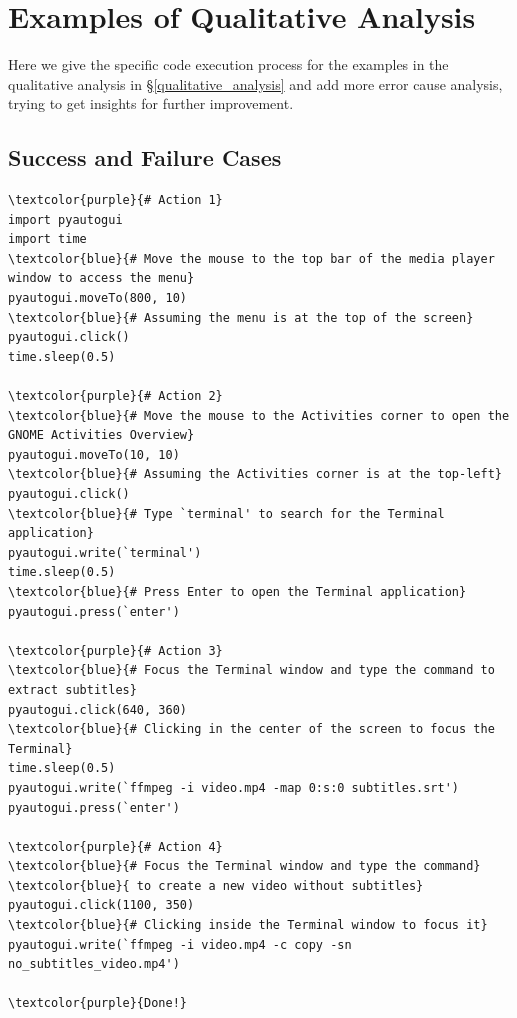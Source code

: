 \section{Examples of Qualitative Analysis}
\label{appendix:qualitative_analysis}

Here we give the specific code execution process for the examples in the qualitative analysis in \S\ref{qualitative_analysis} and add more error cause analysis, trying to get insights for further improvement.

\subsection{Success and Failure Cases}

\begin{tcolorbox}[title={Success Task: \textit{I downloaded an episode of Friends to practice listening, but I don't know how to remove the subtitles. Please help me remove the subtitles from the video and export it as "subtitles.srt" and store it in the same directory as the video.}}]

\small
\begin{Verbatim}[commandchars=\\\{\}]
\textcolor{purple}{# Action 1}
import pyautogui
import time
\textcolor{blue}{# Move the mouse to the top bar of the media player window to access the menu}
pyautogui.moveTo(800, 10)  
\textcolor{blue}{# Assuming the menu is at the top of the screen}
pyautogui.click()
time.sleep(0.5)

\textcolor{purple}{# Action 2}
\textcolor{blue}{# Move the mouse to the Activities corner to open the GNOME Activities Overview}
pyautogui.moveTo(10, 10)  
\textcolor{blue}{# Assuming the Activities corner is at the top-left}
pyautogui.click()
\textcolor{blue}{# Type `terminal' to search for the Terminal application}
pyautogui.write(`terminal')
time.sleep(0.5)
\textcolor{blue}{# Press Enter to open the Terminal application}
pyautogui.press(`enter')

\textcolor{purple}{# Action 3}
\textcolor{blue}{# Focus the Terminal window and type the command to extract subtitles}
pyautogui.click(640, 360)  
\textcolor{blue}{# Clicking in the center of the screen to focus the Terminal}
time.sleep(0.5)
pyautogui.write(`ffmpeg -i video.mp4 -map 0:s:0 subtitles.srt')
pyautogui.press(`enter')

\textcolor{purple}{# Action 4}
\textcolor{blue}{# Focus the Terminal window and type the command}
\textcolor{blue}{ to create a new video without subtitles}
pyautogui.click(1100, 350)  
\textcolor{blue}{# Clicking inside the Terminal window to focus it}
pyautogui.write(`ffmpeg -i video.mp4 -c copy -sn no_subtitles_video.mp4')

\textcolor{purple}{Done!}
\end{Verbatim}
\end{tcolorbox}


